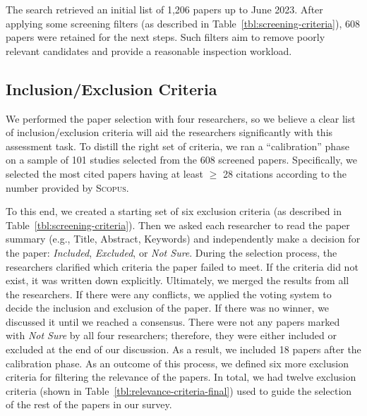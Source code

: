 The search retrieved an initial list of 1,206 papers up to June 2023.
After applying some screening filters (as described in Table~\ref{tbl:screening-criteria}), 608 papers were retained for the next steps.
Such filters aim to remove poorly relevant candidates and provide a reasonable inspection workload.

{}
{}

\subsection{Inclusion/Exclusion Criteria}
\label{sec:relevance-criteria}

{}
{}



We performed the paper selection with four researchers, so we believe a clear list of inclusion/exclusion criteria will aid the researchers significantly with this assessment task.
To distill the right set of criteria, we ran a ``calibration'' phase on a sample of 101 studies selected from the 608 screened papers.
Specifically, we selected the most cited papers having at least $\geq$ 28 citations according to the number provided by \textsc{Scopus}.

{}
{}


To this end, we created a starting set of six exclusion criteria (as described in Table~\ref{tbl:screening-criteria}).
Then we asked each researcher to read the paper summary (e.g., Title, Abstract, Keywords) and independently make a decision for the paper: \textit{Included}, \textit{Excluded}, or \textit{Not Sure}. During the selection process, the researchers clarified which criteria the paper failed to meet. If the criteria did not exist, it was written down explicitly.
Ultimately, we merged the results from all the researchers. If there were any conflicts, we applied the voting system to decide the inclusion and exclusion of the paper. If there was no winner, we discussed it until we reached a consensus. There were not any papers marked with \textit{Not Sure} by all four researchers; therefore, they were either included or excluded at the end of our discussion.
As a result, we included 18 papers after the calibration phase. As an outcome of this process, we defined six more exclusion criteria for filtering the relevance of the papers. In total, we had twelve exclusion criteria (shown in Table~\ref{tbl:relevance-criteria-final}) used to guide the selection of the rest of the papers in our survey.

